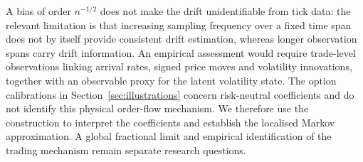 \documentclass{rQUF2e}
\theoremstyle{plain}
\theoremstyle{definition}
\theoremstyle{remark}
\begin{document}
A bias of order $n^{-1/2}$ does not make the drift unidentifiable from tick data: the relevant limitation is that increasing sampling frequency over a fixed time span does not by itself provide consistent drift estimation, whereas longer observation spans carry drift information. An empirical assessment would require trade-level observations linking arrival rates, signed price moves and volatility innovations, together with an observable proxy for the latent volatility state. The option calibrations in Section~\ref{sec:illustrations} concern risk-neutral coefficients and do not identify this physical order-flow mechanism. We therefore use the construction to interpret the coefficients and establish the localised Markov approximation. A global fractional limit and empirical identification of the trading mechanism remain separate research questions.
\end{document}
